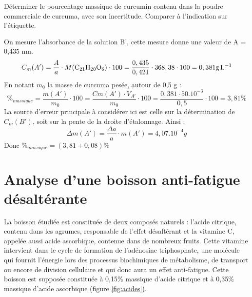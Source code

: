 \documentclass[twoside,a4paper,11pt,answers]{exam}
\begin{document}
\begin{questions}
\begin{framed}
    \question Déterminer le pourcentage massique de curcumin contenu dans la poudre commerciale de curcuma, avec son incertitude. Comparer à l'indication sur l'étiquette.
    \begin{solution}[8cm]
        On mesure l'absorbance de la solution B', cette mesure donne une valeur de A = 0,435 nm.
        \begin{equation*}
            C_m(A') = \frac{A}{a} \cdot M(\ce{C21H20O6}) \cdot 100
                    = \frac{0,435}{0,421} \cdot 368,38 \cdot 100
                    = 0,381 \unit{g.L^{-1}}
        \end{equation*}
    En notant $m_0$ la masse de curcuma pesée, autour de 0,5 g : 
    \begin{equation*}
          \%_{massique} = \frac{m(A')}{m_0} \cdot 100 = \frac{Cm(A')\cdot V_{A'}}{m_0}
          \cdot 100 = \frac{0,381 \cdot 50.10^{-3}}{0,5} \cdot 100
          = 3,81 \%
    \end{equation*}
  La source d'erreur principale à considérer ici est celle sur la détermination de $C_m(B')$, soit sur la pente de la droite d'étalonnage. Ainsi :
  \begin{equation*}
      \Delta m(A') = \frac{\Delta a}{a} \cdot m(A')
      = 4,07.10^{-4} g
  \end{equation*}
  Donc $\%_{massique} = (3,81 \pm 0,08) \%$
    \end{solution}
\end{framed}






    
\end{questions}

\newpage

\section{Analyse d'une boisson anti-fatigue désaltérante}

La boisson étudiée est constituée de deux composés naturels : l'acide citrique, contenu dans les agrumes, responsable de l'effet désaltérant et la vitamine C, appelée aussi acide ascorbique, contenue dans de nombreux fruits. Cette vitamine intervient dans le cycle de formation de l'adénosine triphosphate, une molécule qui fournit l'énergie lors des processus biochimiques de métabolisme, de transport ou encore de division cellulaire et qui donc aura un effet anti-fatigue. Cette boisson est supposée constituée à 0,15\% massique d'acide citrique et à 0,35\% massique d'acide ascorbique (figure \ref{fig:acides}).
\end{document}
